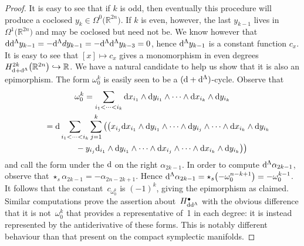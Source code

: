 \documentclass[pdftex]{sigma}
\numberwithin{equation}{section}
\begin{document}
\begin{proof}
It is easy to see that if $k$ is odd, then eventually this procedure will produce a coclosed $y_{k}\in\Omega^{0}\big(\mathbb{R}^{2n}\big)$. If $k$ is even, however, the last $y_{k-1}$ lives in $\Omega^{1}\big(\mathbb{R}^{2n}\big)$ and may be coclosed but need not be. We know however that ${\rm d}{\rm d}^{\Lambda}y_{k-1}=-{\rm d}^{\Lambda}dy_{k-1}=-{\rm d}^{\Lambda}{\rm d}^{\Lambda} y_{k-3}=0$, hence ${\rm d}^{\Lambda}y_{k-1}$ is a constant function $c_x$. It is easy to see that $[x]\mapsto c_x$ gives a monomorphism in even degrees $H^{2k}_{{\rm d}+{\rm d}^{\Lambda}}\big(\mathbb{R}^{2n}\big)\hookrightarrow \mathbb{R}$. We have a natural candidate to help us show that it is also an epimorphism. The form $\omega_0^k$ is easily seen to be a $({\rm d}+{\rm d}^{\Lambda})$-cycle. Observe that
\begin{gather*}
\omega_0^k = \sum_{i_1<\cdots<i_k}{\rm d}x_{i_1}\wedge {\rm d}y_{i_1}\wedge\cdots \wedge {\rm d}x_{i_k}\wedge {\rm d} y_{i_k} \\
\hphantom{\omega_0^k}{} ={\rm d}\sum_{i_1<\cdots<i_k}\sum_{j=1}^{k}\big(\big(x_{i_j}{\rm d} x_{i_1}\wedge {\rm d} y_{i_1}\wedge\cdots\wedge {\rm d}y_{i_j}\wedge\cdots\wedge {\rm d}x_{i_k}\wedge {\rm d} y_{i_k} \\
 \hphantom{\omega_0^k=}{} - y_{i_j}{\rm d}_{i_1}\wedge {\rm d}y_{i_1}\wedge\cdots\wedge {\rm d} x_{i_j}\wedge\cdots\wedge {\rm d}x_{i_k}\wedge {\rm d}y_{i_k} \big) \big)
\end{gather*}
and call the form under the ${\rm d}$ on the right $\alpha_{2k-1}$. In order to compute ${\rm d}^{\Lambda}\alpha_{2k-1}$, observe that $\star_s\alpha_{2k-1}=-\alpha_{2n-2k+1}$. Hence ${\rm d}^{\Lambda} \alpha_{2k-1}=\star_s\big({-}\omega_0^{n-k+1}\big)=-\omega_0^{k-1}$. It follows that the constant~$c_{\omega_0^{k}}$ is $(-1)^k$, giving the epimorphism as claimed. Similar computations prove the assertion about~$H^{\bullet}_{{\rm d}{\rm d}^{\Lambda}}$ with the obvious difference that it is not~$\omega_0^k$ that provides a representative of~1 in each degree: it is instead represented by the antiderivative of these forms. This is notably different behaviour than that present on the compact symplectic manifolds.
\end{proof}
\end{document}
